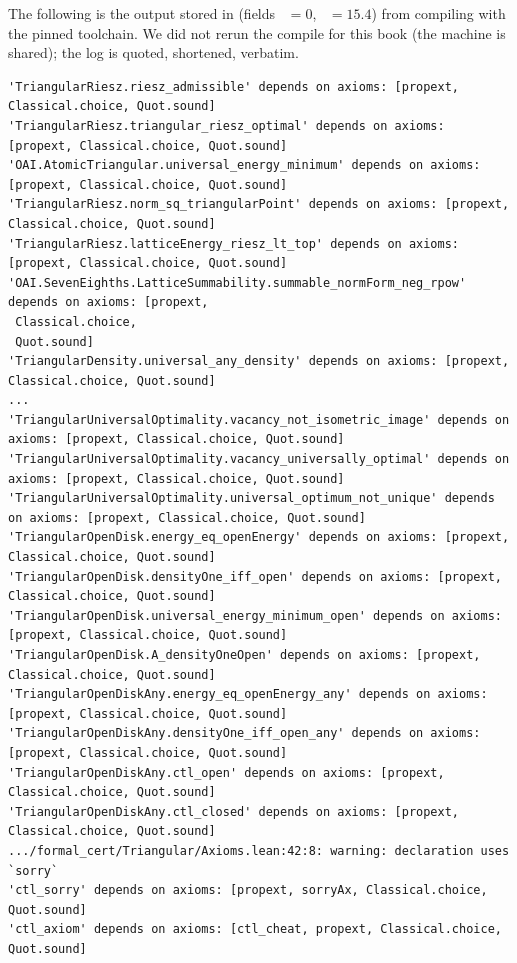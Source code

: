 \begin{numbox}
The following is the output stored in  (fields ~$=0$,
~$=15.4$) from compiling  with the pinned toolchain. We did not rerun the compile for
this book (the machine is shared); the log is quoted, shortened, verbatim.
\begin{lstlisting}
'TriangularRiesz.riesz_admissible' depends on axioms: [propext, Classical.choice, Quot.sound]
'TriangularRiesz.triangular_riesz_optimal' depends on axioms: [propext, Classical.choice, Quot.sound]
'OAI.AtomicTriangular.universal_energy_minimum' depends on axioms: [propext, Classical.choice, Quot.sound]
'TriangularRiesz.norm_sq_triangularPoint' depends on axioms: [propext, Classical.choice, Quot.sound]
'TriangularRiesz.latticeEnergy_riesz_lt_top' depends on axioms: [propext, Classical.choice, Quot.sound]
'OAI.SevenEighths.LatticeSummability.summable_normForm_neg_rpow' depends on axioms: [propext,
 Classical.choice,
 Quot.sound]
'TriangularDensity.universal_any_density' depends on axioms: [propext, Classical.choice, Quot.sound]
...
'TriangularUniversalOptimality.vacancy_not_isometric_image' depends on axioms: [propext, Classical.choice, Quot.sound]
'TriangularUniversalOptimality.vacancy_universally_optimal' depends on axioms: [propext, Classical.choice, Quot.sound]
'TriangularUniversalOptimality.universal_optimum_not_unique' depends on axioms: [propext, Classical.choice, Quot.sound]
'TriangularOpenDisk.energy_eq_openEnergy' depends on axioms: [propext, Classical.choice, Quot.sound]
'TriangularOpenDisk.densityOne_iff_open' depends on axioms: [propext, Classical.choice, Quot.sound]
'TriangularOpenDisk.universal_energy_minimum_open' depends on axioms: [propext, Classical.choice, Quot.sound]
'TriangularOpenDisk.A_densityOneOpen' depends on axioms: [propext, Classical.choice, Quot.sound]
'TriangularOpenDiskAny.energy_eq_openEnergy_any' depends on axioms: [propext, Classical.choice, Quot.sound]
'TriangularOpenDiskAny.densityOne_iff_open_any' depends on axioms: [propext, Classical.choice, Quot.sound]
'TriangularOpenDiskAny.ctl_open' depends on axioms: [propext, Classical.choice, Quot.sound]
'TriangularOpenDiskAny.ctl_closed' depends on axioms: [propext, Classical.choice, Quot.sound]
.../formal_cert/Triangular/Axioms.lean:42:8: warning: declaration uses `sorry`
'ctl_sorry' depends on axioms: [propext, sorryAx, Classical.choice, Quot.sound]
'ctl_axiom' depends on axioms: [ctl_cheat, propext, Classical.choice, Quot.sound]
\end{lstlisting}
\end{numbox}

